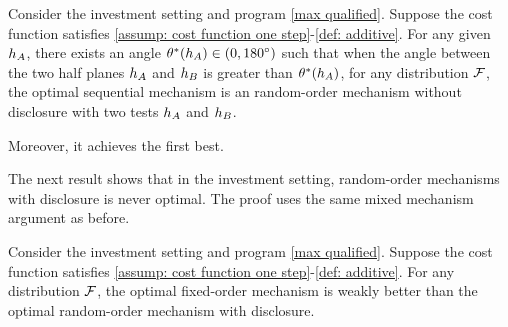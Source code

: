 
\begin{theorem}\label{thm:optimal sequential metric investement}
     Consider  the investment setting and program \ref{max qualified}.
     Suppose the cost function satisfies \cref{assump: cost function one step}-\ref{def: additive}.  
     For any given $h_A$, there exists an angle $\theta^*(h_A) \in (0, 180^{\circ})$ such that when the angle between the two half planes $h_A$ and $h_B$ is greater than $\theta^*(h_A)$, for 
     any distribution $\mathcal{F}$,    
    the optimal sequential mechanism is an random-order mechanism without disclosure with two tests $h_A$ and $h_B$. 
    
    Moreover, it achieves the first best.
\end{theorem}


The next result shows that in the investment setting, random-order mechanisms with disclosure is never optimal. The proof uses the same mixed mechanism argument as before.

\begin{proposition}\label{prop:investment fixed order better than informed}
    Consider  the investment setting and program \ref{max qualified}.
     Suppose the cost function satisfies \cref{assump: cost function one step}-\ref{def: additive}.
    For any distribution $\mathcal{F}$, the optimal fixed-order mechanism is weakly better than the optimal random-order mechanism with disclosure.
\end{proposition}






